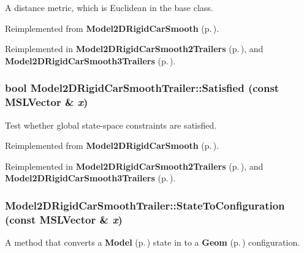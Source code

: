 A distance metric, which is Euclidean in the base class.



Reimplemented from {\bf Model2DRigid\-Car\-Smooth} {\rm (p.\,\pageref{classModel2DRigidCarSmooth_a4})}.

Reimplemented in {\bf Model2DRigid\-Car\-Smooth2Trailers} {\rm (p.\,\pageref{classModel2DRigidCarSmooth2Trailers_a3})}, and {\bf Model2DRigid\-Car\-Smooth3Trailers} {\rm (p.\,\pageref{classModel2DRigidCarSmooth3Trailers_a3})}.
\subsubsection{\setlength{\rightskip}{0pt plus 5cm}bool Model2DRigid\-Car\-Smooth\-Trailer::Satisfied (const {\bf MSLVector} \& {\em x})\hspace{0.3cm}{\tt  [virtual]}}\label{classModel2DRigidCarSmoothTrailer_a5}


Test whether global state-space constraints are satisfied.



Reimplemented from {\bf Model2DRigid\-Car\-Smooth} {\rm (p.\,\pageref{classModel2DRigidCarSmooth_a6})}.

Reimplemented in {\bf Model2DRigid\-Car\-Smooth2Trailers} {\rm (p.\,\pageref{classModel2DRigidCarSmooth2Trailers_a5})}, and {\bf Model2DRigid\-Car\-Smooth3Trailers} {\rm (p.\,\pageref{classModel2DRigidCarSmooth3Trailers_a5})}.
\subsubsection{ Model2DRigid\-Car\-Smooth\-Trailer::State\-To\-Configuration (const {\bf MSLVector} \& {\em x})\hspace{0.3cm}{\tt  [virtual]}}\label{classModel2DRigidCarSmoothTrailer_a4}


A method that converts a {\bf Model} {\rm (p.\,\pageref{classModel})} state in to a {\bf Geom} {\rm (p.\,\pageref{classGeom})} configuration.




